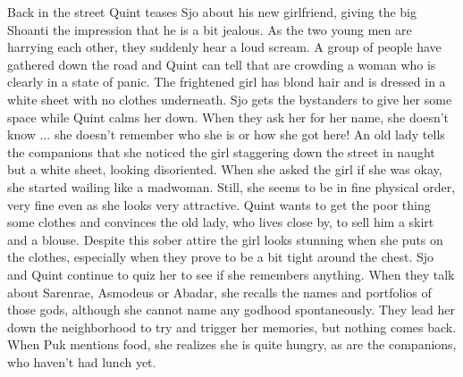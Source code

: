 Back in the street Quint teases Sjo about his new girlfriend, giving the big Shoanti the impression that he is a bit jealous. As the two young men are harrying each other, they suddenly hear a loud scream. A group of people have gathered down the road and Quint can tell that are crowding a woman who is clearly in a state of panic. The frightened girl has blond hair and is dressed in a white sheet with no clothes underneath. Sjo gets the bystanders to give her some space while Quint calms her down. When they ask her for her name, she doesn't know ... she doesn't remember who she is or how she got here! An old lady tells the companions that she noticed the girl staggering down the street in naught but a white sheet, looking disoriented. When she asked the girl if she was okay, she started wailing like a madwoman. Still, she seems to be in fine physical order, very fine even as she looks very attractive. Quint wants to get the poor thing some clothes and convinces the old lady, who lives close by, to sell him a skirt and a blouse. Despite this sober attire the girl looks stunning when she puts on the clothes, especially when they prove to be a bit tight around the chest. Sjo and Quint continue to quiz her to see if she remembers anything. When they talk about Sarenrae, Asmodeus or Abadar, she recalls the names and portfolios of those gods, although she cannot name any godhood spontaneously. They lead her down the neighborhood to try and trigger her memories, but nothing comes back. When Puk mentions food, she realizes she is quite hungry, as are the companions, who haven't had lunch yet.\\

